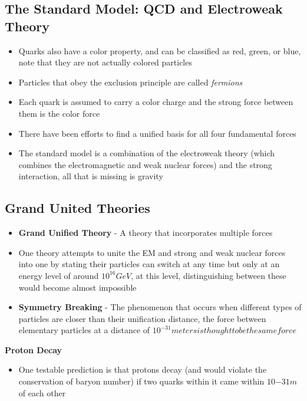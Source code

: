 \subsection{The Standard Model: QCD and Electroweak Theory}
\begin{itemize}
    \item Quarks also have a color property, and can be classified as red, green, or blue, note that they are not actually colored particles
    \item Particles that obey the exclusion principle are called \emph{fermions}
    \item Each quark is assumed to carry a color charge and the strong force between them is the color force
    \item There have been efforts to find a unified basis for all four fundamental forces
    \item The standard model is a combination of the electroweak theory (which combines the electromagnetic and weak nuclear forces) and the strong interaction, all that is missing is gravity
\end{itemize}

\subsection{Grand United Theories}
\begin{itemize}
    \item \textbf{Grand Unified Theory} - A theory that incorporates multiple forces
    \item One theory attempts to unite the EM and strong and weak nuclear forces into one by stating their particles can switch at any time but only at an energy level of around \(10^{16}GeV\), at this level, distinguishing between these would become almost impossible
    \item \textbf{Symmetry Breaking} - The phenomenon that occurs when different types of particles are closer than their unification distance, the force between elementary particles at a distance of \(10^{-31} meters is thought to be the same force\)
\end{itemize}

\textbf{Proton Decay}
\begin{itemize}
    \item One testable prediction is that protons decay (and would violate the conservation of baryon number) if two quarks within it came within \(10{-31}m\) of each other
\end{itemize}

